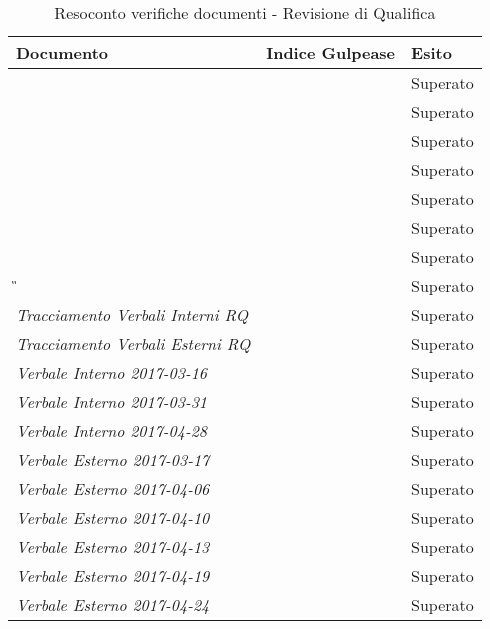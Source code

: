 		\begin{table}[H]
			\begin{longtable}{>{\centering\arraybackslash}p{5cm}|>{\centering\arraybackslash}p{5cm} | >{\centering\arraybackslash}p{5cm}}
				\hline
				\rowcolor{Gray}
				\textbf{Documento} & \textbf{Indice Gulpease} & \textbf{Esito} \\
				\hline
				\textit{\DDP} &   & Superato\\
				\hline
				\textit{\MU} &   & Superato\\
				\hline
				\textit{\ST} &   & Superato\\
				\hline
				\textit{\NdP} &   & Superato\\
				\hline
				\textit{\PdP} &  & Superato \\
				\hline
				\textit{\PdQ} &   & Superato\\
				\hline
				\textit{\AdR} &   & Superato \\
				\hline
				\textit{\G}&  & Superato\\
				\hline
				\textit{Tracciamento Verbali Interni RQ}		& 		&	Superato	\\
				\hline
				\textit{Tracciamento Verbali Esterni RQ}		& 		&	Superato	\\
				\hline
				\textit{Verbale Interno 2017-03-16}		& 		&	Superato	\\
				\hline
				\textit{Verbale Interno 2017-03-31}		& 		&	Superato	\\
				\hline
				\textit{Verbale Interno 2017-04-28}		& 		&	Superato	\\
				\hline
				\textit{Verbale Esterno 2017-03-17}		& 		&	Superato	\\
				\hline
				\textit{Verbale Esterno 2017-04-06}		& 		&	Superato	\\
				\hline
				\textit{Verbale Esterno 2017-04-10}		& 		&	Superato	\\
				\hline
				\textit{Verbale Esterno 2017-04-13}		& 		&	Superato	\\
				\hline
				\textit{Verbale Esterno 2017-04-19}		& 		&	Superato	\\
				\hline
				\textit{Verbale Esterno 2017-04-24}		& 		&	Superato	\\
				\hline
			\end{longtable}
			\caption{Resoconto verifiche documenti - Revisione di Qualifica}
		\end{table}
